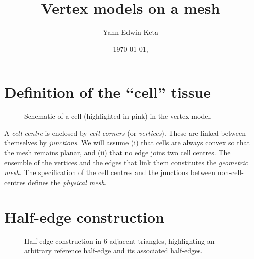 \documentclass[aps, superscriptaddress, notitlepage]{revtex4-1}
\begin{document}

\title{Vertex models on a mesh}
\author{Yann-Edwin Keta}
\date{\today, \currenttime}
\maketitle


\section{Definition of the ``cell'' tissue}

\begin{figure}[H]
\centering
\begin{tikzpicture}[scale=0.75*\scale]

\end{tikzpicture}
\caption{Schematic of a cell (highlighted in pink) in the vertex model.}
\label{fig:schematic}
\end{figure}

A \textit{cell centre} is enclosed by \textit{cell corners} (or \textit{vertices}). These are linked between themselves by \textit{junctions}. We will assume (i) that cells are always convex so that the mesh remains planar, and (ii) that no edge joins two cell centres. The ensemble of the vertices and the edges that link them constitutes the \textit{geometric mesh}. The specification of the cell centres and the junctions between non-cell-centres defines the \textit{physical mesh}.

\section{Half-edge construction}

\begin{figure}[!b]
\centering
\begin{tikzpicture}[scale=0.8*\scale]

\end{tikzpicture}
\caption{Half-edge construction in 6 adjacent triangles, highlighting an arbitrary reference half-edge and its associated half-edges.}
\label{fig:he}
\end{figure}
\end{document}
